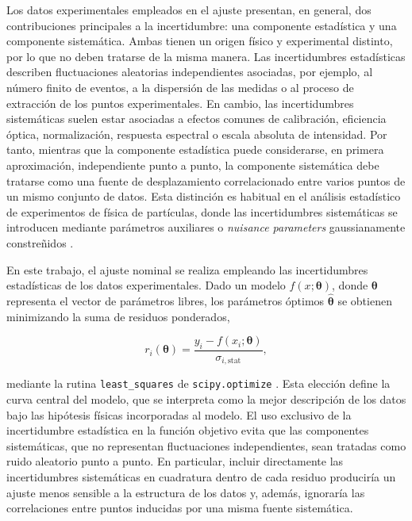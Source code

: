 \documentclass[12pt,a4paper]{article}
\begin{document}
Los datos experimentales empleados en el ajuste presentan, en general, dos contribuciones principales a la incertidumbre: una componente estadística y una componente sistemática. Ambas tienen un origen físico y experimental distinto, por lo que no deben tratarse de la misma manera. Las incertidumbres estadísticas describen fluctuaciones aleatorias independientes asociadas, por ejemplo, al número finito de eventos, a la dispersión de las medidas o al proceso de extracción de los puntos experimentales. En cambio, las incertidumbres sistemáticas suelen estar asociadas a efectos comunes de calibración, eficiencia óptica, normalización, respuesta espectral o escala absoluta de intensidad. Por tanto, mientras que la componente estadística puede considerarse, en primera aproximación, independiente punto a punto, la componente sistemática debe tratarse como una fuente de desplazamiento correlacionado entre varios puntos de un mismo conjunto de datos. Esta distinción es habitual en el análisis estadístico de experimentos de física de partículas, donde las incertidumbres sistemáticas se introducen mediante parámetros auxiliares o \textit{nuisance parameters} gaussianamente constreñidos \cite{Barlow2002,Cowan2011,Conway2011,Cranmer2012HistFactory,PDGStatistics2024}.

En este trabajo, el ajuste nominal se realiza empleando las incertidumbres estadísticas de los datos experimentales. Dado un modelo $f(x;\boldsymbol{\theta})$, donde $\boldsymbol{\theta}$ representa el vector de parámetros libres, los parámetros óptimos $\hat{\boldsymbol{\theta}}$ se obtienen minimizando la suma de residuos ponderados,

\[
r_i(\boldsymbol{\theta})=
\frac{y_i-f(x_i;\boldsymbol{\theta})}
{\sigma_{i,\mathrm{stat}}},
\]

mediante la rutina \texttt{least\_squares} de \texttt{scipy.optimize} \cite{Virtanen2020SciPy}. Esta elección define la curva central del modelo, que se interpreta como la mejor descripción de los datos bajo las hipótesis físicas incorporadas al modelo. El uso exclusivo de la incertidumbre estadística en la función objetivo evita que las componentes sistemáticas, que no representan fluctuaciones independientes, sean tratadas como ruido aleatorio punto a punto. En particular, incluir directamente las incertidumbres sistemáticas en cuadratura dentro de cada residuo produciría un ajuste menos sensible a la estructura de los datos y, además, ignoraría las correlaciones entre puntos inducidas por una misma fuente sistemática.
\end{document}
